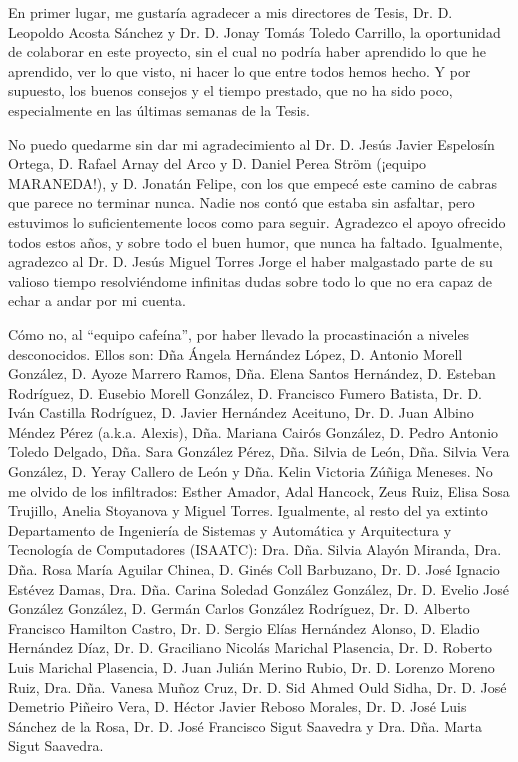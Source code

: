 \cleardoublepage
\thispagestyle{empty}

En primer lugar, me gustaría agradecer a mis directores de Tesis, Dr. D. Leopoldo Acosta Sánchez y Dr. D. Jonay Tomás Toledo Carrillo, la oportunidad de colaborar en este proyecto, sin el cual no podría haber aprendido lo que he aprendido, ver lo que visto, ni hacer lo que entre todos hemos hecho. Y por supuesto, los buenos consejos y el tiempo prestado, que no ha sido poco, especialmente en las últimas semanas de la Tesis.

No puedo quedarme sin dar mi agradecimiento al Dr. D. Jesús Javier Espelosín Ortega, D. Rafael Arnay del Arco y D. Daniel Perea Ström (¡equipo MARANEDA!), y D. Jonatán Felipe, con los que empecé este camino de cabras que parece no terminar nunca. Nadie nos contó que estaba sin asfaltar, pero estuvimos lo suficientemente locos como para seguir. Agradezco el apoyo ofrecido todos estos años, y sobre todo el buen humor, que nunca ha faltado. Igualmente, agradezco al Dr. D. Jesús Miguel Torres Jorge el haber malgastado parte de su valioso tiempo resolviéndome infinitas dudas sobre todo lo que no era capaz de echar a andar por mi cuenta. 

Cómo no, al ``equipo cafeína'', por haber llevado la procastinación a niveles desconocidos. Ellos son: Dña Ángela Hernández López, D. Antonio Morell González, D. Ayoze Marrero Ramos, Dña. Elena Santos Hernández, D. Esteban Rodríguez, D. Eusebio Morell González, D. Francisco Fumero Batista, Dr. D. Iván Castilla Rodríguez, D. Javier Hernández Aceituno, Dr. D. Juan Albino Méndez Pérez (a.k.a. Alexis), Dña. Mariana Cairós González, D. Pedro Antonio Toledo Delgado, Dña. Sara González Pérez, Dña. Silvia de León, Dña. Silvia Vera González, D. Yeray Callero de León y Dña. Kelin Victoria Zúñiga Meneses. No me olvido de los infiltrados: Esther Amador, Adal Hancock, Zeus Ruiz, Elisa Sosa Trujillo, Anelia Stoyanova y Miguel Torres. Igualmente, al resto del ya extinto Departamento de Ingeniería de Sistemas y Automática y Arquitectura y Tecnología de Computadores (ISAATC): Dra. Dña. Silvia Alayón Miranda, Dra. Dña. Rosa María Aguilar Chinea, D. Ginés Coll Barbuzano, Dr. D. José Ignacio Estévez Damas, Dra. Dña. Carina Soledad González González, Dr. D. Evelio José González González, D. Germán Carlos González Rodríguez, Dr. D. Alberto Francisco Hamilton Castro, Dr. D. Sergio Elías Hernández Alonso, D. Eladio Hernández Díaz, Dr. D. Graciliano Nicolás Marichal Plasencia, Dr. D. Roberto Luis Marichal Plasencia, D. Juan Julián Merino Rubio, Dr. D. Lorenzo Moreno Ruiz, Dra. Dña. Vanesa Muñoz Cruz, Dr. D. Sid Ahmed Ould Sidha, Dr. D. José Demetrio Piñeiro Vera, D. Héctor Javier Reboso Morales, Dr. D. José Luis Sánchez de la Rosa, Dr. D. José Francisco Sigut Saavedra y Dra. Dña. Marta Sigut Saavedra.

